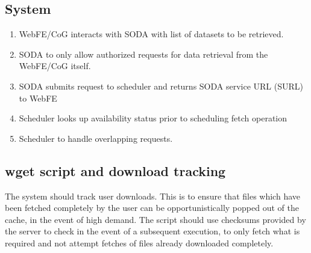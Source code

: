 \documentclass[oneside,12pt]{memoir}
\begin{document}
\subsection{System}
\begin{enumerate}
\item WebFE/CoG interacts with SODA with list of datasets to be retrieved.
\item SODA to only allow authorized requests for data retrieval from the WebFE/CoG itself.
\item SODA submits request to scheduler and returns SODA service URL (SURL) to WebFE  
\item Scheduler looks up availability status prior to scheduling fetch operation
\item Scheduler to handle overlapping requests.
\end{enumerate}
\subsection{wget script and download tracking}
The system should track user downloads. This is to ensure that files which have been fetched completely by the user can be opportunistically popped out of the cache, in the event of high demand. The script should use checksums provided by the server to check in the event of a subsequent execution, to only fetch what is required and not attempt fetches of files already downloaded completely.
\end{document}
